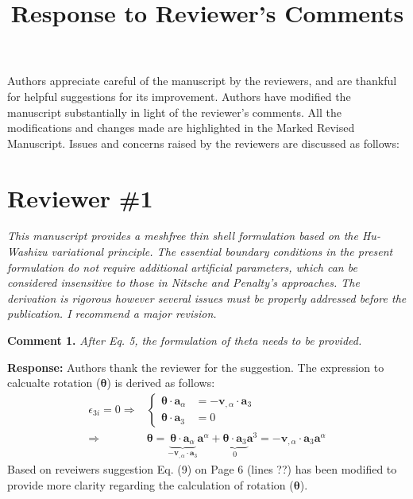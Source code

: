 \documentclass{article}
\title{Response to Reviewer's Comments}
\author{}
\date{}
\begin{document}
\maketitle

Authors appreciate careful of the manuscript by the reviewers, and are thankful for helpful suggestions for its improvement. Authors have modified the manuscript substantially in light of the reviewer's comments. All the modifications and changes made are highlighted in the Marked Revised Manuscript. Issues and concerns raised by the reviewers are discussed as follows:

\section*{Reviewer \#1}
\textit{This manuscript provides a meshfree thin shell formulation based on the Hu-Washizu variational principle. The essential boundary conditions in the present formulation do not require additional artificial parameters, which can be considered insensitive to those in Nitsche and Penalty’s approaches. The derivation is rigorous however several issues must be properly addressed before the publication. I recommend a major revision.}

\textbf{Comment 1.} \textit{After Eq. 5, the formulation of theta needs to be provided.}

\textbf{Response:} Authors thank the reviewer for the suggestion. The expression to calcualte rotation ($\boldsymbol \theta$) is derived as follows:
\begin{equation}
    \begin{split}
        \epsilon_{3i} = 0 \Rightarrow &
        \left \{
        \begin{split}
            \boldsymbol \theta \cdot \boldsymbol a_\alpha &= - \boldsymbol v_{,\alpha} \cdot \boldsymbol a_3 \\
            \boldsymbol \theta \cdot \boldsymbol a_3 &= 0
        \end{split}
        \right . \\ \Rightarrow &
        \boldsymbol \theta = \underbrace{\boldsymbol \theta \cdot \boldsymbol a_{\alpha}}_{- \boldsymbol v_{,\alpha} \cdot \boldsymbol a_3} \boldsymbol a^\alpha 
        + \underbrace{\boldsymbol \theta \cdot \boldsymbol a_3}_{0} \boldsymbol a^3 = - \boldsymbol v_{,\alpha} \cdot \boldsymbol a_3 \boldsymbol a^\alpha
    \end{split}
\end{equation}
Based on reveiwers suggestion Eq. (9) on Page 6 (lines ??) has been modified to provide more clarity regarding the calculation of rotation ($\boldsymbol \theta$).
\end{document}
